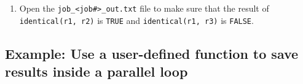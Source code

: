 \documentclass[
]{book}
\newenvironment{Shaded}{\begin{snugshade}}{\end{snugshade}}
\newcommand{\ExtensionTok}[1]{#1}
\newcommand{\NormalTok}[1]{#1}
\begin{document}
\begin{enumerate}
\begin{Shaded}
\end{Shaded}
\item
  Open the \texttt{job\_\textless{}job\#\textgreater{}\_out.txt} file to make sure that the result of \texttt{identical(r1,\ r2)} is \texttt{TRUE} and \texttt{identical(r1,\ r3)} is \texttt{FALSE}.
\end{enumerate}

\hypertarget{example-use-a-user-defined-function-to-save-results-inside-a-parallel-loop}{%
\subsection{Example: Use a user-defined function to save results inside a parallel loop}\label{example-use-a-user-defined-function-to-save-results-inside-a-parallel-loop}}
\end{document}

